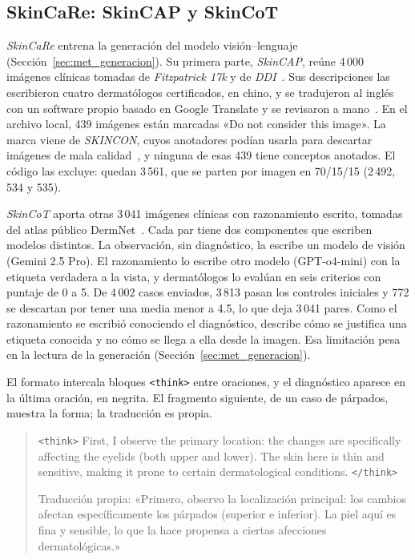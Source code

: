 \subsection{SkinCaRe: SkinCAP y SkinCoT}

\emph{SkinCaRe} entrena la generación del modelo visión--lenguaje (Sección~\ref{sec:met_generacion}). Su primera parte,
\emph{SkinCAP}, reúne 4\,000 imágenes clínicas tomadas de \emph{Fitzpatrick 17k} y de \emph{DDI}~\cite{groh2021neural,daneshjou2022disparities}.
Sus descripciones las escribieron cuatro dermatólogos certificados, en chino, y se tradujeron al inglés con un software
propio basado en Google Translate y se revisaron a mano~\cite{shen2025skincare}. En el archivo local, 439 imágenes están
marcadas «Do not consider this image». La marca viene de \emph{SKINCON}, cuyos anotadores podían usarla para
descartar imágenes de mala calidad~\cite{daneshjou2022skincon}, y ninguna de esas 439 tiene conceptos anotados. El
código las excluye: quedan 3\,561, que se parten por imagen en 70/15/15 (2\,492, 534 y 535).

\emph{SkinCoT} aporta otras 3\,041 imágenes clínicas con razonamiento escrito, tomadas del atlas público
DermNet~\cite{shen2025skincare}.
Cada par tiene dos componentes que escriben modelos distintos. La observación, sin diagnóstico, la escribe un modelo de
visión (Gemini 2.5 Pro). El razonamiento lo escribe otro modelo (GPT-o4-mini) con la etiqueta verdadera a la vista, y
dermatólogos lo evalúan en seis criterios con puntaje de 0 a 5. De 4\,002 casos enviados, 3\,813 pasan los controles
iniciales y 772 se descartan por tener una media menor a 4.5, lo que deja 3\,041 pares. Como el razonamiento se escribió
conociendo el diagnóstico, describe cómo se justifica una etiqueta conocida y no cómo se llega a ella desde la imagen.
Esa limitación pesa en la lectura de la generación (Sección~\ref{sec:met_generacion}).

El formato intercala bloques \texttt{\textless{}think\textgreater{}} entre oraciones, y el diagnóstico aparece en la última
oración, en negrita. El fragmento siguiente, de un caso de párpados, muestra la forma; la traducción es propia.

\begin{quote}
    \small
    \texttt{\textless{}think\textgreater{}} First, I observe the primary location: the changes are specifically affecting
    the eyelids (both upper and lower). The skin here is thin and sensitive, making it prone to certain dermatological
    conditions. \texttt{\textless{}/think\textgreater{}}

    \noindent Traducción propia: «Primero, observo la localización principal: los cambios afectan específicamente los
    párpados (superior e inferior). La piel aquí es fina y sensible, lo que la hace propensa a ciertas afecciones
    dermatológicas.»
\end{quote}

